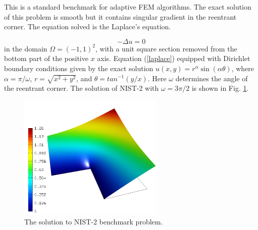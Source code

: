 \documentclass[12pt]{elsarticle}
\begin{document}
This is a standard benchmark for adaptive FEM algorithms.
The exact solution of this problem is smooth but it contains
singular gradient in the reentrant corner.
The equation solved is the Laplace's equation.

\begin{equation} \label{laplace}
-\Delta u = 0
\end{equation}
in the domain $\Omega = (-1, 1)^2$, with a unit square
section removed from the bottom part of the positive $x$ axis.
Equation (\ref{laplace}) equipped with Dirichlet
boundary conditions given by the exact solution
$u(x, y) = r^{\alpha}\sin(\alpha \theta)$,
where $\alpha = \pi / \omega$, $r = \sqrt{x^2+y^2}$,
and $\theta = tan^{-1}(y/x)$. Here $\omega $ determines
the angle of the reentrant corner.
The solution of NIST-2 with $\omega = 3 \pi / 2$
is shown in Fig. \ref{fig:sln-nist02}.

\begin{figure}[H]
\centering
\vspace{-3mm}
\includegraphics[height=6cm]{nist/nist-2/solution.png}
\vspace{-3mm}
\caption{The solution to NIST-2 benchmark problem.}
\label{fig:sln-nist02}
\end{figure}
\end{document}
